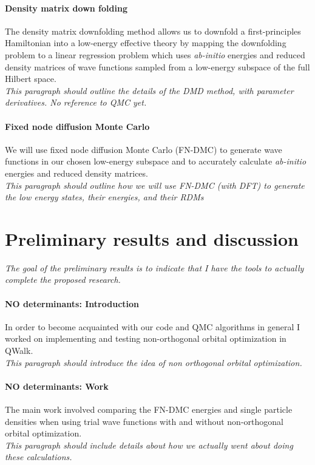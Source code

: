 \documentclass{article}
\begin{document}
\paragraph{Density matrix down folding} 
The density matrix downfolding method allows us to downfold a first-principles Hamiltonian into a low-energy effective theory by mapping the downfolding problem to a linear regression problem which uses \textit{ab-initio} energies and reduced density matrices of wave functions sampled from a low-energy subspace of the full Hilbert space.
\\
\textit{This paragraph should outline the details of the DMD method, with parameter derivatives. No reference to QMC yet.}

\paragraph{Fixed node diffusion Monte Carlo}
We will use fixed node diffusion Monte Carlo (FN-DMC) to generate wave functions in our chosen low-energy subspace and to accurately calculate \textit{ab-initio} energies and reduced density matrices.
\\
\textit{This paragraph should outline how we will use FN-DMC (with DFT) to generate the low energy states, their energies, and their RDMs}
\pagebreak

\section{Preliminary results and discussion}
\textit{The goal of the preliminary results is to indicate that I have the tools to actually complete the proposed research.}

\paragraph{NO determinants: Introduction} In order to become acquainted with our code  and QMC algorithms in general I worked on implementing and testing non-orthogonal orbital optimization in QWalk. 
\\
\textit{This paragraph should introduce the idea of non orthogonal orbital optimization.}

\paragraph{NO determinants: Work} The main work involved comparing the FN-DMC energies and single particle densities when using trial wave functions with and without non-orthogonal orbital optimization.
\\
\textit{This paragraph should include details about how we actually went about doing these calculations.}
\end{document}
